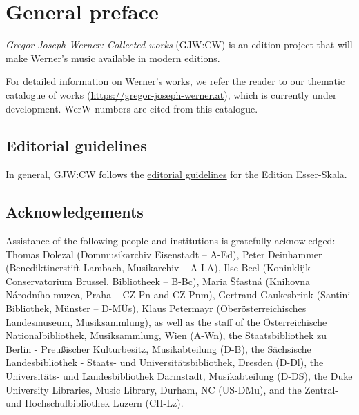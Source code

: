 \documentclass{ees}
\begin{document}

\setcounter{page}{1}

\tableofcontents

\chapter{General preface}

\textit{Gregor Joseph Werner: Collected works} (GJW:CW) is an edition project that will make Werner’s music available in modern editions.

For detailed information on Werner's works, we refer the reader to our thematic catalogue of works (\href{https://gregor-joseph-werner.at}{https://gregor-joseph-werner.at}), which is currently under development. WerW numbers are cited from this catalogue.


\section{Editorial guidelines}

In general, GJW:CW follows the \href{https://edition.esser-skala.at/about/editorial-guidelines/}{editorial guidelines} for the Edition Esser-Skala.




\section{Acknowledgements}

Assistance of the following people and institutions is gratefully acknowledged:
Thomas Dolezal (Dommusikarchiv Eisenstadt – A-Ed),
Peter Deinhammer (Benediktinerstift Lambach, Musikarchiv – A-LA),
Ilse Beel (Koninklijk Conservatorium Brussel, Bibliotheek – B-Bc),
Maria Šťastná (Knihovna Národního muzea, Praha – CZ-Pn and CZ-Pnm),
Gertraud Gaukesbrink (Santini-Bibliothek, Münster – D-MÜs),
Klaus Petermayr (Oberösterreichisches Landesmuseum, Musiksammlung),
as well as the staff of
the Österreichische Nationalbibliothek, Musiksammlung, Wien (A-Wn),
the Staatsbibliothek zu Berlin - Preußischer Kulturbesitz, Musikabteilung (D-B),
the Sächsische Landesbibliothek - Staats- und Universitätsbibliothek, Dresden (D-Dl),
the Universitäts- und Landesbibliothek Darmstadt, Musikabteilung (D-DS),
the Duke University Libraries, Music Library, Durham, NC (US-DMu),
and the Zentral- und Hochschulbibliothek Luzern (CH-Lz).


\clearpage
{}
\end{document}
